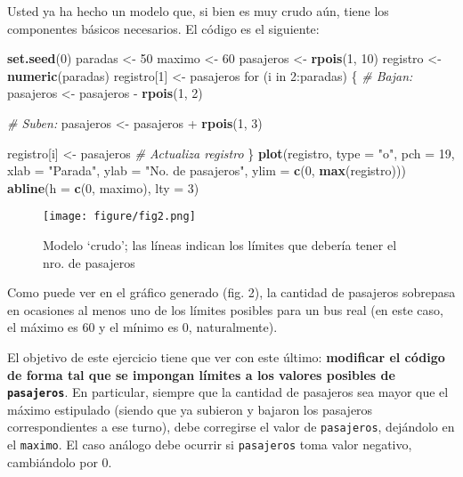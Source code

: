 \documentclass[]{article}
\makeatletter
\newenvironment{Shaded}{}{}
\newcommand{\KeywordTok}[1]{\textcolor[rgb]{0.00,0.44,0.13}{\textbf{{#1}}}}
\newcommand{\DataTypeTok}[1]{\textcolor[rgb]{0.56,0.13,0.00}{{#1}}}
\newcommand{\DecValTok}[1]{\textcolor[rgb]{0.25,0.63,0.44}{{#1}}}
\newcommand{\StringTok}[1]{\textcolor[rgb]{0.25,0.44,0.63}{{#1}}}
\newcommand{\CommentTok}[1]{\textcolor[rgb]{0.38,0.63,0.69}{\textit{{#1}}}}
\newcommand{\NormalTok}[1]{{#1}}
\def\maxwidth{\ifdim\Gin@nat@width>\linewidth\linewidth
\else\Gin@nat@width\fi}
\let\Oldincludegraphics\includegraphics
\renewcommand{\includegraphics}[1]{\Oldincludegraphics[width=\maxwidth]{#1}}
\makeatother
\begin{document}
Usted ya ha hecho un modelo que, si bien es muy crudo aún, tiene los
componentes básicos necesarios. El código es el siguiente:

\begin{Shaded}
\begin{Highlighting}[]
\KeywordTok{set.seed}\NormalTok{(}\DecValTok{0}\NormalTok{)}
\NormalTok{paradas <- }\DecValTok{50}
\NormalTok{maximo <- }\DecValTok{60}
\NormalTok{pasajeros <- }\KeywordTok{rpois}\NormalTok{(}\DecValTok{1}\NormalTok{, }\DecValTok{10}\NormalTok{)}
\NormalTok{registro <- }\KeywordTok{numeric}\NormalTok{(paradas)}
\NormalTok{registro[}\DecValTok{1}\NormalTok{] <- pasajeros}
\NormalTok{for (i in }\DecValTok{2}\NormalTok{:paradas) \{}
    \CommentTok{# Bajan:}
    \NormalTok{pasajeros <- pasajeros - }\KeywordTok{rpois}\NormalTok{(}\DecValTok{1}\NormalTok{, }\DecValTok{2}\NormalTok{)}

    \CommentTok{# Suben:}
    \NormalTok{pasajeros <- pasajeros + }\KeywordTok{rpois}\NormalTok{(}\DecValTok{1}\NormalTok{, }\DecValTok{3}\NormalTok{)}

    \NormalTok{registro[i] <- pasajeros  }\CommentTok{# Actualiza registro}
\NormalTok{\}}
\KeywordTok{plot}\NormalTok{(registro, }\DataTypeTok{type =} \StringTok{"o"}\NormalTok{, }\DataTypeTok{pch =} \DecValTok{19}\NormalTok{, }\DataTypeTok{xlab =} \StringTok{"Parada"}\NormalTok{, }\DataTypeTok{ylab =} \StringTok{"No. de pasajeros"}\NormalTok{, }
    \DataTypeTok{ylim =} \KeywordTok{c}\NormalTok{(}\DecValTok{0}\NormalTok{, }\KeywordTok{max}\NormalTok{(registro)))}
\KeywordTok{abline}\NormalTok{(}\DataTypeTok{h =} \KeywordTok{c}\NormalTok{(}\DecValTok{0}\NormalTok{, maximo), }\DataTypeTok{lty =} \DecValTok{3}\NormalTok{)}
\end{Highlighting}
\end{Shaded}
\begin{figure}[htbp]
\centering
\texttt{[image: figure/fig2.png]}
\caption{Modelo `crudo'; las líneas indican los límites que debería
tener el nro. de pasajeros}
\end{figure}

Como puede ver en el gráfico generado (fig. 2), la cantidad de pasajeros
sobrepasa en ocasiones al menos uno de los límites posibles para un bus
real (en este caso, el máximo es 60 y el mínimo es 0, naturalmente).

El objetivo de este ejercicio tiene que ver con este último:
\textbf{modificar el código de forma tal que se impongan límites a los
valores posibles de \texttt{pasajeros}}. En particular, siempre que la
cantidad de pasajeros sea mayor que el máximo estipulado (siendo que ya
subieron y bajaron los pasajeros correspondientes a ese turno), debe
corregirse el valor de \texttt{pasajeros}, dejándolo en el
\texttt{maximo}. El caso análogo debe ocurrir si \texttt{pasajeros} toma
valor negativo, cambiándolo por 0.
\end{document}
